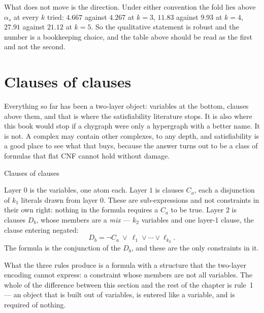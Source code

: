 What does not move is the direction. Under either convention the fold lies above
$\alpha_{s}$ at every $k$ tried: $4.667$ against $4.267$ at $k=3$, $11.83$
against $9.93$ at $k=4$, $27.91$ against $21.12$ at $k=5$. So the qualitative
statement is robust and the number is a bookkeeping choice, and the table above
should be read as the first and not the second.

\section{Clauses of clauses}
\label{sec:nested}

Everything so far has been a two-layer object: variables at the bottom,
clauses above them, and that is where the satisfiability literature stops.
It is also where this book would stop if a chygraph were only a hypergraph
with a better name. It is not. A complex may contain other complexes, to any
depth, and satisfiability is a good place to see what that buys, because the
answer turns out to be a class of formulas that flat CNF cannot hold without
damage.

\begin{model}{Clauses of clauses}
\begin{rules}
 Layer $0$ is the variables, one atom each.
 Layer $1$ is clauses $C_{a}$, each a disjunction of
$k_{1}$ literals drawn from layer $0$. These are sub-expressions and not
constraints in their own right: nothing in the formula requires a $C_{a}$ to be
true.
 Layer $2$ is clauses $D_{b}$, whose members are a
\emph{mix} --- $k_{2}$ variables and one layer-1 clause, the clause entering
negated:
\begin{equation}
  D_{b}=\neg C_{a}\ \vee\ \ell_{1}\vee\cdots\vee\ell_{k_{2}}.
  \label{eq:nested}
\end{equation}
The formula is the conjunction of the $D_{b}$, and these are the only
constraints in it.
\end{rules}
\end{model}

What the three rules produce is a formula with a structure that the two-layer
encoding cannot express: a constraint whose members are not all variables. The
whole of the difference between this section and the rest of the chapter is
rule~1 --- an object that is built out of variables, is entered like a variable,
and is required of nothing.

